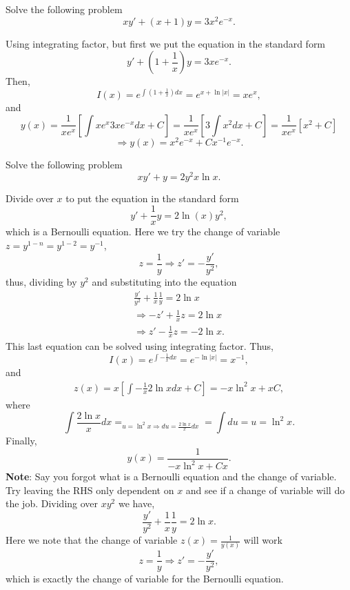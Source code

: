 \documentclass[11pt]{article}
\begin{document}
\begin{problem}
Solve the following problem
\begin{equation*}
     xy'+(x+1)y=3x^{2}e^{-x}.
\end{equation*}
\end{problem}
\begin{solution}
Using integrating factor, but first we put the equation in the standard form
\[y' + \left(1+\frac{1}{x}\right)y = 3xe^{-x}.\]
Then,
\[I(x)=e^{\int \left(1+\frac{1}{x}\right)dx}=e^{x+\ln|x|}=xe^{x},\]
and
\[y(x)=\frac{1}{xe^{x}}\left[\int xe^{x}3xe^{-x}dx + C\right]=\frac{1}{xe^{x}}\left[3\int x^{2}dx + C\right]=\frac{1}{xe^{x}}\left[x^{2}+C\right]\]
\[\Rightarrow \boxed{y(x)=x^{2}e^{-x}+Cx^{-1}e^{-x}}.\]
\end{solution}




\begin{problem}
Solve the following problem
\begin{equation*}
 x y' + y = 2 y^{2}x \ln x.
\end{equation*}
\end{problem}
\begin{solution}
Divide over $x$ to put the equation in the standard form
\[y' + \frac{1}{x}y = 2 \ln (x) y^{2},\]
which is a Bernoulli equation. Here we try the change of variable $z=y^{1-n}=y^{1-2}=y^{-1}$, 
\[z=\frac{1}{y} \Rightarrow z'=-\frac{y'}{y^{2}},\]
thus, dividing by $y^{2}$ and substituting into the equation  
\begin{equation*}\begin{split}
     \frac{y'}{y^{2}} + \frac{1}{x}\frac{1}{y} = 2 \ln x \\
     \Rightarrow -z'+\frac{1}{x}z=2\ln x\\
     \Rightarrow z' -\frac{1}{x}z = -2\ln x.
\end{split}\end{equation*}
This last equation can be solved using integrating factor. Thus,
\[I(x)=e^{\int -\frac{1}{x}dx}=e^{-\ln |x|}=x^{-1},\]
and 
\begin{eqnarray*}
     z(x) =x\left[ \int -\frac{1}{x}2\ln x dx + C\right] = -x \ln^{2} x + x C , 
\end{eqnarray*}
where \[\int \frac{2\ln x}{x} dx =_{u=\ln^{2}x \Rightarrow du = \frac{2\ln x}{x}dx} =  \int du = u = \ln^{2} x.\]
Finally,
\[\boxed{y(x)=\frac{1}{-x\ln^{2} x + C x}}.\]
\textbf{Note}: Say you forgot what is a Bernoulli equation and the change of variable. Try leaving the RHS only dependent on $x$ and see if a change of variable will do the job. Dividing over $xy^{2}$ we have,
\[\frac{y'}{y^{2}}+\frac{1}{x}\frac{1}{y}=2\ln x.\]
Here we note that the change of variable $z(x)=\frac{1}{y(x)}$ will work
\[z=\frac{1}{y} \Rightarrow z'=-\frac{y'}{y^{2}},\]
which is exactly the change of variable for the Bernoulli equation.
\end{solution}
\end{document}

